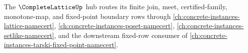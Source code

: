 The $\CompleteLatticeUp$ hub routes its finite join, meet, certified-family, monotone-map, and fixed-point boundary rows through \autoref{ch:concrete-instances-lattice-namecert}, \autoref{ch:concrete-instances-poset-namecert}, \autoref{ch:concrete-instances-setlike-namecert}, and the downstream fixed-row consumer of \autoref{ch:concrete-instances-tarski-fixed-point-namecert}.



